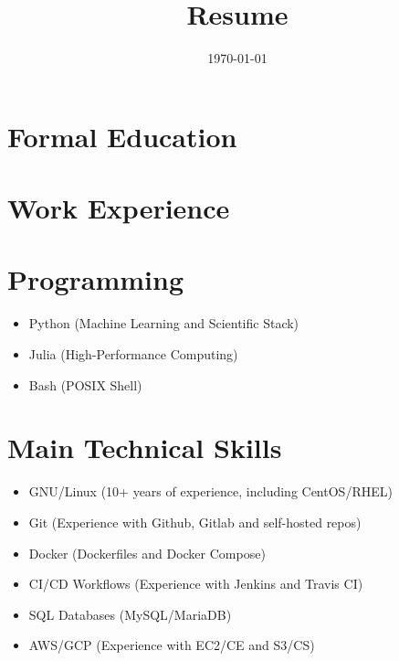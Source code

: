\documentclass[a4paper, 11pt]{moderncv}
\date{\today}
\title{Resume}
\begin{document}
\maketitle

\section{Formal Education}
\label{sec:orgcd57ccc}


\section{Work Experience}
\label{sec:orgafa19e7}

\section{Programming}
\label{sec:org2bddd8c}
\begin{itemize}
\item Python (Machine Learning and Scientific Stack)
\item Julia (High-Performance Computing)
\item Bash (POSIX Shell)
\end{itemize}

\section{Main Technical Skills}
\label{sec:org3d5d121}
\begin{itemize}
\item GNU/Linux (10+ years of experience, including CentOS/RHEL)
\item Git (Experience with Github, Gitlab and self-hosted repos)
\item Docker (Dockerfiles and Docker Compose)
\item CI/CD Workflows (Experience with Jenkins and Travis CI)
\item SQL Databases (MySQL/MariaDB)
\item AWS/GCP (Experience with EC2/CE and S3/CS)
\end{itemize}
\end{document}
